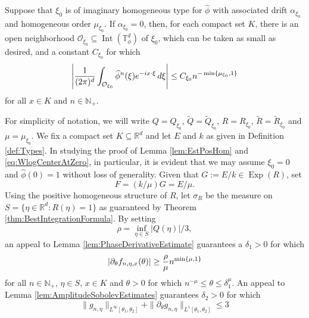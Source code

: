 \documentclass[smallextended]{svjour3}
\theoremstyle{remark}
\renewenvironment{proof}[1][\proofname]{\renewcommand\xproofname{#1}\xproof}{\endxproof}
\newcommand\Exp{\operatorname{Exp}}
\newcommand\Interior{\operatorname{Int}}
\newcommand{\p}{\partial}
\newcommand{\f}[2]{\frac{#1}{#2}}
\begin{document}
\begin{lemma}\label{lem:EstImagHom}
Suppose that $\xi_0$ is of imaginary homogeneous type for $\widehat{\phi}$ with associated drift $\alpha_{\xi_0}$ and homogeneous order $\mu_{\xi_0}$. If $\alpha_{\xi_0}=0$, then, for each compact set $K$, there is an open neighborhood $\mathcal{O}_{\xi_0}\subseteq\Interior(\mathbb{T}_\phi^d)$ of $\xi_0$, which can be taken as small as desired, and a constant $C_{\xi_0}$ for which
\begin{equation*}
    \abs{\f{1}{(2\pi)^d}\int_{\mathcal{O}_{\xi_0}}\widehat{\phi}^n(\xi)e^{-ix\cdot\xi}\,d\xi}\leq C_{\xi_0}n^{-\min\{\mu_{\xi_0},1\}}
\end{equation*}
for all $x\in K$ and $n\in\mathbb{N}_+$.
\end{lemma}
\begin{proof}
For simplicity of notation, we will write $Q=Q_{\xi_0}$, $\widetilde{Q}=\widetilde{Q}_{\xi_0}$, $R=R_{\xi_0}$, $\widetilde{R}=\widetilde{R}_{\xi_0}$ and $\mu=\mu_{\xi_0}$. We fix a compact set $K\subseteq\mathbb{R}^d$ and let $E$ and $k$ as given in Definition \ref{def:Types}. In studying the proof of Lemma \ref{lem:EstPosHom} and \eqref{eq:WlogCenterAtZero}, in particular, it is evident that we may assume $\xi_0=0$ and $\widehat{\phi}(0)=1$ without loss of generality. Given that $G:=E/k\in\Exp(R)$, set
\begin{equation*}
    F=(k/\mu)G=E/\mu.
\end{equation*} Using the positive homogeneous structure of $R$, let $\sigma_R$ be the measure on $S=\{\eta\in \mathbb{R}^d:R(\eta)=1\}$ as guaranteed by Theorem \ref{thm:BestIntegrationFormula}. By setting
\begin{equation*}
    \rho=\inf_{\eta\in S}|Q(\eta)|/3,
\end{equation*}
an appeal to Lemma \ref{lem:PhaseDerivativeEstimate} guarantees a $\delta_1>0$ for which 
\begin{equation}\label{eq:EstImagHom1}
    \abs{\partial_{\theta}f_{n,\eta,x}(\theta)}\geq \frac{\rho}{\mu}n^{\min\{\mu,1\}}
\end{equation} for all $n\in\mathbb{N}_+$, $\eta\in S$, $x\in K$ and $\theta>0$ for which $n^{-\mu}\leq \theta\leq \delta_1^\mu$. An appeal to Lemma \ref{lem:AmplitudeSobolevEstimates} guarantees $\delta_2>0$ for which
\begin{equation}\label{eq:EstImagHom2}
    \|g_{n,\eta}\|_{L^\infty[\theta_1,\theta_2]}
    +
    \|\p_\theta g_{n,\eta} \|_{ L^1[\theta_1,\theta_2]}
    \leq 3
\end{equation}

\end{proof}
\end{document}
